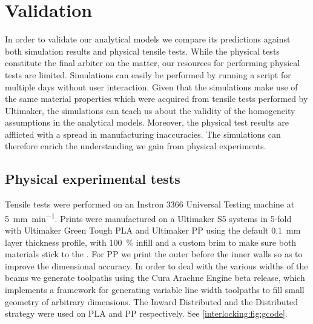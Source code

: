 \section{Validation}\label{interlocking:sec:validation}
In order to validate our analytical models we compare its predictions against both simulation results and physical tensile tests.
While the physical tests constitute the final arbiter on the matter,
our resources for performing physical tests are limited.
Simulations can easily be performed by running a script for multiple days without user interaction.
Given that the simulations make use of the same material properties which were acquired from tensile tests performed by Ultimaker,
the simulations can teach us about the validity of the homogeneity assumptions in the analytical models.
Moreover, the physical test results are afflicted with a spread in manufacturing inaccuracies.
The simulations can therefore enrich the understanding we gain from physical experiments.







\subsection{Physical experimental tests}
Tensile tests were performed on an Instron 3366 Universal Testing machine at \SI{5}{\milli\meter\per\minute}.
Prints were manufactured on a Ultimaker S5 systems in 5-fold with Ultimaker Green Tough PLA and Ultimaker PP using the default \SI{0.1}{\milli\meter} layer thickness profile,
with \SI{100}{\percent} infill and a custom brim to make sure both materials stick to the .
For PP we print the outer before the inner walls so as to improve the dimensional accuracy. %
In order to deal with the various widths of the beams we generate toolpaths using the Cura Arachne Engine beta release\cite{CuraArachne},
which implements a framework for generating variable line width toolpaths to fill small geometry of arbitrary dimensions\cite{Kuipers2020}.
The Inward Distributed and the Distributed strategy were used on PLA and PP respectively.
See \cref{interlocking:fig:gcode}.



